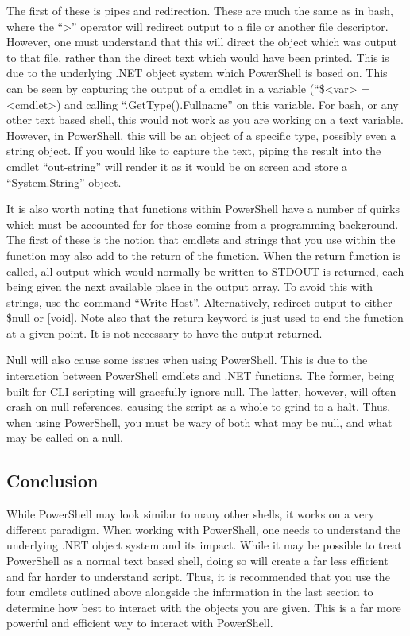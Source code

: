 			The first of these is pipes and redirection. 
			These are much the same as in bash, where the ``>'' operator will redirect output to a file or another file descriptor. 
			However, one must understand that this will direct the object which was output to that file, rather than the direct text which would have been printed. 
			This is due to the underlying .NET object system which PowerShell is based on. 
			This can be seen by capturing the output of a cmdlet in a variable (``\$<var> = <cmdlet>) and calling ``.GetType().Fullname'' on this variable.
			For bash, or any other text based shell, this would not work as you are working on a text variable. 
			However, in PowerShell, this will be an object of a specific type, possibly even a string object. 
			If you would like to capture the text, piping the result into the cmdlet ``out-string'' will render it as it would be on screen and store a ``System.String'' object. 

			It is also worth noting that functions within PowerShell have a number of quirks which must be accounted for for those coming from a programming background. 
			The first of these is the notion that cmdlets and strings that you use within the function may also add to the return of the function. 
			When the return function is called, all output which would normally be written to STDOUT is returned, each being given the next available place in the output array. 
			To avoid this with strings, use the command ``Write-Host''. 
			Alternatively, redirect output to either \$null or [void]. 
			Note also that the return keyword is just used to end the function at a given point. 
			It is not necessary to have the output returned. 

			Null will also cause some issues when using PowerShell. 
			This is due to the interaction between PowerShell cmdlets and .NET functions. 
			The former, being built for CLI scripting will gracefully ignore null. 
			The latter, however, will often crash on null references, causing the script as a whole to grind to a halt. 
			Thus, when using PowerShell, you must be wary of both what may be null, and what may be called on a null. 
			
		\subsection{Conclusion}
			While PowerShell may look similar to many other shells, it works on a very different paradigm. 
			When working with PowerShell, one needs to understand the underlying .NET object system and its impact. 
			While it may be possible to treat PowerShell as a normal text based shell, doing so will create a far less efficient and far harder to understand script. 
			Thus, it is recommended that you use the four cmdlets outlined above alongside the information in the last section to determine how best to interact with the objects you are given. 
			This is a far more powerful and efficient way to interact with PowerShell. 
